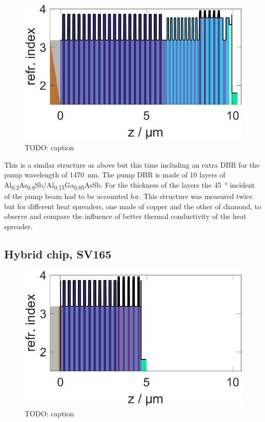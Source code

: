 \begin{figure}
    \vspace{-\baselineskip}
    \centering
    \includegraphics[width=.98\textwidth]{images/1SV167B.lay.png}
    \caption{TODO: caption}
    \label{fig:sv167}
\end{figure}

This is a similar structure as above but this time including an extra DBR for the pump wavelength of \qty{1470}{\nm}. The pump DBR is made of 10 layers of Al\textsubscript{0.2}As\textsubscript{0.8}Sb/Al\textsubscript{0.15}Ga\textsubscript{0.85}AsSb. For the thickness of the layers the \qty{45}{\degree} incident of the pump beam had to be accounted for. This structure was measured twice but for different heat spreaders, one made of copper and the other of diamond, to observe and compare the influence of better thermal conductivity of the heat spreader.


\subsection*{Hybrid chip, SV165}

\begin{figure}
    \vspace{-\baselineskip}
    \centering
    \includegraphics[width=.98\textwidth]{images/1SV165.lay.png}
    \caption{TODO: caption}
    \label{fig:sv165}
\end{figure}

